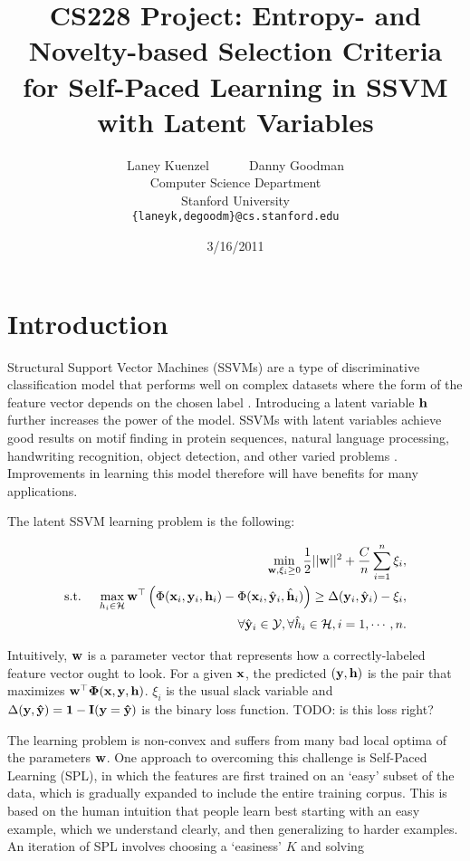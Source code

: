 \documentclass{article}
\title{CS228 Project: Entropy- and Novelty-based Selection Criteria for Self-Paced Learning in SSVM with Latent Variables}
\date{3/16/2011}
\author{
Laney Kuenzel ~~~~~ Danny Goodman\\
Computer Science Department \\
Stanford University \\
\texttt{\{laneyk,degoodm\}@cs.stanford.edu}
}
\newcommand{\mysection}[1]{\vspace{-4mm}\section{#1}\vspace{-4mm}}
\begin{document}
\maketitle
\vspace{-8mm}

\mysection{Introduction}
\label{sec:introduction}
Structural Support Vector Machines (SSVMs) are a type of discriminative classification model that performs well on complex datasets where the form of the feature vector depends on the chosen label \cite{SSVM}.  Introducing a latent variable $\bf h$ further increases the power of the model.  SSVMs with latent variables achieve good results on motif finding in protein sequences, natural language processing, handwriting recognition, object detection, and other varied problems \cite{SPL,App1}.  Improvements in learning this model therefore will have benefits for many applications.

The latent SSVM learning problem is the following\cite{SPL}:

\begin{eqnarray}
&&\min_{{\bf w},\xi_i \geq 0} \frac{1}{2}||{\bf w}||^2 + \frac{C}{n} \sum_{i=1}^n \xi_i, \nonumber \\
\mbox{s.t. } && \max_{h_i \in {\cal H}} {\bf w}^\top \left(\Phi({\bf x}_i,{\bf y}_i,{\bf h}_i) - 
		\Phi({\bf x}_i,\hat{\bf y}_i,\hat{\bf h}_i) \right)
	 \geq \Delta({\bf y}_i,\hat{\bf y}_i) - \xi_i, \nonumber \\
\label{eq:latentSSVM}
&&\forall \hat{\bf y}_i \in {\cal Y}, \forall \hat{h}_i \in {\cal H}, i=1,\cdots,n.
\end{eqnarray}

Intuitively, $\bf w$ is a parameter vector that represents how a correctly-labeled feature vector ought to look.  For a given $\bf x$, the predicted $(\bf y,\bf h)$ is the pair that maximizes $\bf{{w}} ^\top \Phi(\bf x,\bf y,\bf h)$.  $\xi_i$ is the usual slack variable 
and $\Delta(\bf y,\hat{\bf y})=1-I(\bf y=\hat{\bf y})$ is the binary loss function. TODO: is this loss right?

The learning problem is non-convex and suffers from many bad local optima of the parameters $\bf w$.  One approach to overcoming this challenge is Self-Paced Learning (SPL), in which the features are first trained on an `easy' subset of the data, which is gradually expanded to include the entire training corpus\cite{SPL}.  This is based on the human intuition that people learn best starting with an easy example, which we understand clearly, and then generalizing to harder examples.  An iteration of SPL involves choosing a `easiness' $K$ and solving
\end{document}
